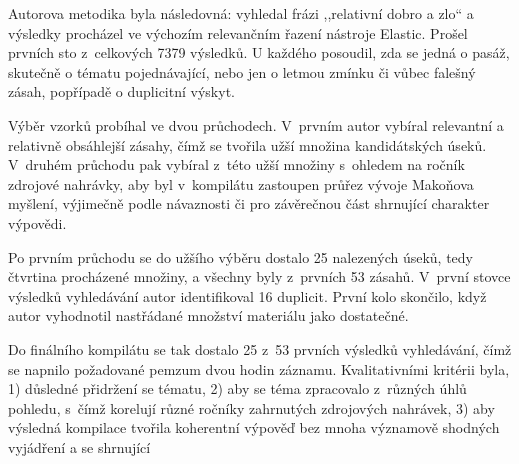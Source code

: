 Autorova metodika byla následovná: vyhledal frázi ,,relativní dobro a zlo`` a
výsledky procházel ve výchozím relevančním řazení nástroje Elastic. Prošel
prvních sto z~celkových 7379 výsledků. U každého posoudil, zda se jedná o
pasáž, skutečně o tématu pojednávající, nebo jen o letmou zmínku či vůbec
falešný zásah, popřípadě o duplicitní výskyt.

Výběr vzorků probíhal ve dvou průchodech. V~prvním autor vybíral relevantní a
relativně obsáhlejší zásahy, čímž se tvořila užší množina kandidátských úseků.
V~druhém průchodu pak vybíral z~této užší množiny s~ohledem na ročník zdrojové
nahrávky, aby byl v~kompilátu zastoupen průřez vývoje Makoňova myšlení,
výjimečně podle návaznosti či pro závěrečnou část shrnující charakter výpovědi.

Po prvním průchodu se do užšího výběru dostalo 25 nalezených úseků, tedy
čtvrtina procházené množiny, a všechny byly z~prvních 53 zásahů. V~první stovce
výsledků vyhledávání autor identifikoval 16 duplicit. První kolo skončilo, když
autor vyhodnotil nastřádané množství materiálu jako dostatečné.

Do finálního kompilátu se tak dostalo 25 z~53 prvních výsledků vyhledávání, čímž
se napnilo požadované pemzum dvou hodin záznamu. Kvalitativními kritérii byla,
1) důsledné přidržení se tématu, 2) aby se téma zpracovalo z~různých úhlů
pohledu, s~čímž korelují různé ročníky zahrnutých zdrojových nahrávek, 3) aby
výsledná kompilace tvořila koherentní výpověď bez mnoha významově shodných
vyjádření a se shrnující
